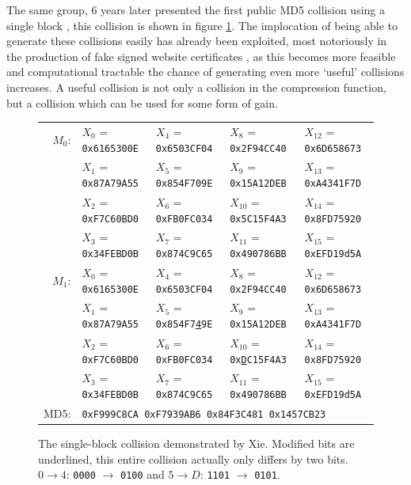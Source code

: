 \documentclass[a4paper,12pt]{article}
\begin{document}


The same group, 6 years later presented the first public MD5 collision using a single block \cite{Xie2013}, this collision is shown in figure \ref{fig:colxie}. The implocation of being able to generate these collisions easily has already been exploited, most notoriously in the production of fake signed website certificates \cite{Stevens}, as this becomes more feasible and computational tractable the chance of generating even more `useful' collisions increases. A useful collision is not only a collision in the compression function, but a collision which can be used for some form of gain.
\begin{figure}
\begin{tabular}{|r|  l l l l|}
$M_0$:& $X_0$ = \texttt{0x6165300E} & $X_4$ = \texttt{0x6503CF04} & $X_8$ = \texttt{0x2F94CC40} & $X_{12}$ = \texttt{0x6D658673} \\
	& $X_1$ = \texttt{0x87A79A55} & $X_5$ = \texttt{0x854F709E} & $X_9$ = \texttt{0x15A12DEB} & $X_{13}$ = \texttt{0xA4341F7D} \\
	& $X_2$ = \texttt{0xF7C60BD0} & $X_6$ = \texttt{0xFB0FC034} & $X_{10}$ = \texttt{0x5C15F4A3} & $X_{14}$ = \texttt{0x8FD75920} \\
	& $X_3$ = \texttt{0x34FEBD0B} & $X_7$ = \texttt{0x874C9C65} & $X_{11}$ = \texttt{0x490786BB} & $X_{15}$ = \texttt{0xEFD19d5A} \\
$M_1$:& $X_0$ = \texttt{0x6165300E} & $X_4$ = \texttt{0x6503CF04} & $X_8$ = \texttt{0x2F94CC40} & $X_{12}$ = \texttt{0x6D658673} \\
& $X_1$ = \texttt{0x87A79A55} & $X_5$ = \texttt{0x854F7{\underline 4}9E} & $X_9$ = \texttt{0x15A12DEB} & $X_{13}$ = \texttt{0xA4341F7D} \\
    & $X_2$ = \texttt{0xF7C60BD0} & $X_6$ = \texttt{0xFB0FC034} & $X_{10}$ = \texttt{0x{\underline D}C15F4A3} & $X_{14}$ = \texttt{0x8FD75920} \\
	& $X_3$ = \texttt{0x34FEBD0B} & $X_7$ = \texttt{0x874C9C65} & $X_{11}$ = \texttt{0x490786BB} & $X_{15}$ = \texttt{0xEFD19d5A} \\
    MD5: & \multicolumn{4}{l|}{\texttt{0xF999C8CA 0xF7939AB6 0x84F3C481 0x1457CB23}}

\end{tabular}
\caption{The single-block collision demonstrated by Xie\cite{Xie2013}. Modified bits are underlined, this entire collision actually only differs by two bits.\\$0 \rightarrow 4$: \texttt{0000} $\rightarrow$ \texttt{0100} and 
$5 \rightarrow D$: \texttt{1101} $\rightarrow$ \texttt{0101}.
}
\label{fig:colxie}
\end{figure}
\end{document}
